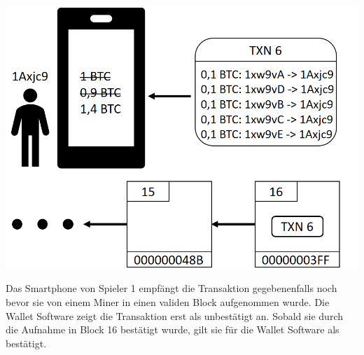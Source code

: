 \vspace{1cm}
\begin{minipage}{0.55\textwidth}
\includegraphics[width=\textwidth]{Figures/konzept_btc/konzept12}
\centering
\decoRule
{}
\label{fig:konzept12}
\end{minipage}
\begin{minipage}{0.45\textwidth}
Das Smartphone von Spieler 1 empfängt die Transaktion gegebenenfalls noch bevor sie von einem Miner in einen validen Block aufgenommen wurde. Die Wallet Software zeigt die Transaktion erst als unbestätigt an. Sobald sie durch die Aufnahme in Block 16 bestätigt wurde, gilt sie für die Wallet Software als bestätigt.
\end{minipage}